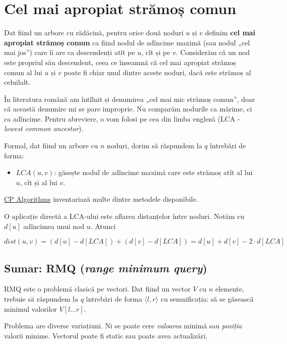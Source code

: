 \documentclass[../main.tex]{subfiles}
\begin{document}
\chapter{Cel mai apropiat strămoș comun}
\label{chapter:lca}

Dat fiind un arbore cu rădăcină, pentru orice două noduri $u$ și $v$ definim \textbf{cel mai apropiat strămoș comun} ca fiind nodul de adîncime maximă (sau nodul „cel mai jos”) care îi are ca descendenți atît pe $u$, cît și pe $v$. Considerăm că un nod este propriul său descendent, ceea ce înseamnă că cel mai apropiat strămoș comun al lui $u$ și $v$ poate fi chiar unul dintre aceste noduri, dacă este strămoș al celuilalt.

În literatura română am întîlnit și denumirea „cel mai mic strămoș comun”, doar că această denumire mi se pare improprie. Nu comparăm nodurile ca mărime, ci ca adîncime. Pentru abreviere, o vom folosi pe cea din limba engleză (LCA - \textit{lowest common ancestor}).

Formal, dat fiind un arbore cu $n$ noduri, dorim să răspundem la $q$ întrebări de forma:

\begin{itemize}
  \item $LCA(u, v)$: găsește nodul de adîncime maximă care este strămoș atît al lui $u$, cît și al lui $v$.
\end{itemize}

\href{https://cp-algorithms.com/graph/lca.html}{CP Algorithms} inventariază multe dintre metodele disponibile.

O aplicație directă a LCA-ului este aflarea distanțelor între noduri. Notăm cu $d[u]$ adîncimea unui nod $u$. Atunci

$$dist(u,v) = (d[u] - d[LCA]) + (d[v] - d[LCA]) = d[u] + d[v] - 2 \cdot d[LCA]$$

\section{Sumar: RMQ (\textit{range minimum query})}

RMQ este o problemă clasică pe vectori. Dat fiind un vector $V$ cu $n$ elemente, trebuie să răspundem la $q$ întrebări de forma $\langle l, r \rangle$ cu semnificația: să se găsească minimul valorilor $V[l \dots r]$.

Problema are diverse variațiuni. Ni se poate cere \textit{valoarea} minimă sau \textit{poziția} valorii minime. Vectorul poate fi static sau poate avea actualizări.
\end{document}
